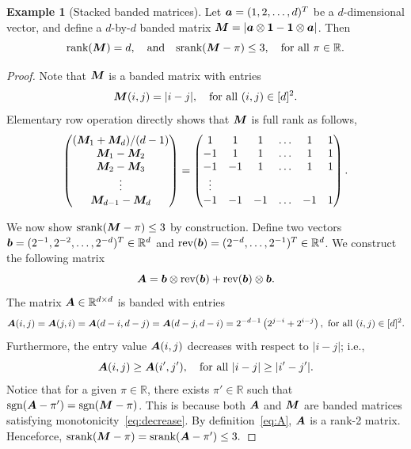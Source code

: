 \documentclass[11pt]{article}
\theoremstyle{plain}
\theoremstyle{definition}
\newtheorem{example}{Example}[section]
\def\sign{\textup{sgn}}
\def\srank{\textup{srank}}
\def\rank{\textup{rank}}
\begin{document}
\begin{example}[Stacked banded matrices]\label{example:banded} Let $\bm{a}=(1,2,\ldots,d)^T$ be a $d$-dimensional vector, and define a $d$-by-$d$ banded matrix $\bm M=|\bm{a}\otimes \mathbf{1}-\mathbf{1}\otimes \bm{a}|$. Then
\[
\rank(\mM)=d,\quad \text{and}\quad \srank(\mM-\pi)\leq 3, \quad \text{for all }\pi\in \mathbb{R}.
\]
\end{example}
\begin{proof}
Note that $\bm M$ is a banded matrix with entries
\[
\bm M(i,j)={|i-j|}, \quad \text{for all }(i,j)\in[d]^2.
\]
Elementary row operation directly shows that $\bm M$ is full rank as follows,
\begin{align}
\begin{pmatrix}
(\bm M_1+\bm M_d)/(d-1)\\
\bm M_1-\bm M_2\\
\bm M_2-\bm M_3\\
\vdots\\
\bm M_{d-1}-\bm M_{d}
\end{pmatrix} = 
\begin{pmatrix}
1&1&1&\ldots&1&1\\
-1&1&1&\ldots&1&1\\
-1&-1&1&\ldots&1&1\\
\vdots\\
-1&-1&-1&\ldots&-1&1
\end{pmatrix}.
\end{align}

We now show $\srank(\mM-\pi)\leq 3$ by construction. Define two vectors $\bm{b}=(2^{-1},2^{-2},\ldots,2^{-d})^T\in\mathbb{R}^d$ and $\text{rev}(\bm{b})=(2^{-d},\ldots,2^{-1})^T\in\mathbb{R}^d$. We construct the following matrix
\begin{equation}\label{eq:A}
\bm A=\bm{b}\otimes\text{rev}(\bm{b})+\text{rev}(\bm{b})\otimes\bm{b}.
\end{equation}
The matrix $\bm A\in\mathbb{R}^{d\times d}$ is banded with entries
\[
\mA(i,j)=\mA(j,i)=\mA(d-i,d-j)=\mA(d-j,d-i)=2^{-d-1}\left(2^{j-i}+2^{i-j}\right),\ \text{for all }(i,j)\in[d]^2.
\] 
Furthermore, the entry value $\bm A(i,j)$ decreases with respect to $|i-j|$; i.e., 
\begin{equation}\label{eq:decrease}
\bm A(i,j) \geq \bm A(i',j'), \quad \text{for all }|i-j|\geq |i'-j'|.
\end{equation}
Notice that for a given $\pi\in\mathbb{R}$, there exists $\pi'\in\mathbb{R}$ such that $\sign(\mA-\pi')=\sign(\mM-\pi)$. This is because both $\bm A$ and $\bm M$ are banded matrices satisfying monotonicity~\eqref{eq:decrease}. By definition~\eqref{eq:A}, $\bm A$ is a rank-2 matrix. Henceforce, $\srank(\mM-\pi)=\srank(\mA-\pi')\leq 3.$
\end{proof}
\end{document}
